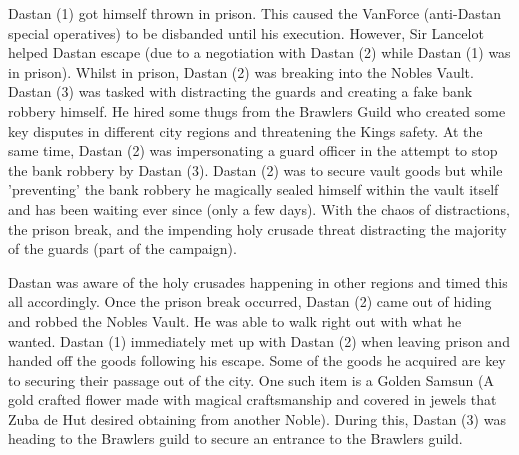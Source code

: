 Dastan (1) got himself thrown in prison. This caused the VanForce (anti-Dastan special operatives) to be disbanded until his execution. However, Sir Lancelot helped Dastan escape (due to a negotiation with Dastan (2) while Dastan (1) was in prison). Whilst in prison, Dastan (2) was breaking into the Nobles Vault. Dastan (3) was tasked with distracting the guards and creating a fake bank robbery himself. He hired some thugs from the Brawlers Guild who created some key disputes in different city regions and threatening the Kings safety. At the same time, Dastan (2) was impersonating a guard officer in the attempt to stop the bank robbery by Dastan (3). Dastan (2) was to secure vault goods but while 'preventing' the bank robbery he magically sealed himself within the vault itself and has been waiting ever since (only a few days). With the chaos of distractions, the prison break, and the impending holy crusade threat distracting the majority of the guards (part of the campaign). 

Dastan was aware of the holy crusades happening in other regions and timed this all accordingly. Once the prison break occurred, Dastan (2) came out of hiding and robbed the Nobles Vault. He was able to walk right out with what he wanted. Dastan (1) immediately met up with Dastan (2) when leaving prison and handed off the goods following his escape. Some of the goods he acquired are key to securing their passage out of the city. One such item is a Golden Samsun (A gold crafted flower made with magical craftsmanship and covered in jewels that Zuba de Hut desired obtaining from another Noble). During this, Dastan (3) was heading to the Brawlers guild to secure an entrance to the Brawlers guild.

